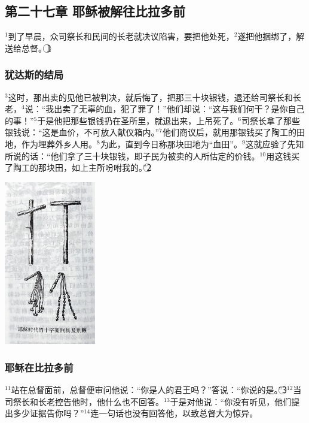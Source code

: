 \subsection{第二十七章 耶稣被解往比拉多前}
$^{1}$到了早晨，众司祭长和民间的长老就决议陷害\UL[耶稣]，要把他处死，$^{2}$遂把他捆绑了，解送给总督\UL[比拉多]。\textcircled{1}


\subsubsection{犹达斯的结局}
$^{3}$这时，那出卖\UL[耶稣]的\UL[犹达斯]见他已被判决，就后悔了，把那三十块银钱，退还给司祭长和长老，$^{4}$说：“我出卖了无辜的血，犯了罪了！”他们却说：“这与我们何干？是你自己的事！”$^{5}$于是他把那些银钱扔在圣所里，就退出来，上吊死了。$^{6}$司祭长拿了那些银钱说：“这是血价，不可放入献仪箱内。”$^{7}$他们商议后，就用那银钱买了陶工的田地，作为埋葬外乡人用。$^{8}$为此，直到今日称那块田地为“血田”。$^{9}$这就应验了\UL[耶肋米亚]先知所说的话：“他们拿了三十块银钱，即\UL[以色列]子民为被卖的人所估定的价钱。$^{10}$用这钱买了陶工的那块田，如上主所吩咐我的。”\textcircled{2}

\begin{center}
  \includegraphics[width=40mm]{images/耶稣时代的十字架刑具及刑鞭.png}
\end{center}


\subsubsection{耶稣在比拉多前}
$^{11}$\UL[耶稣]站在总督面前，总督便审问他说：“你是\UL[犹太]人的君王吗？”\UL[耶稣]答说：“你说的是。”\textcircled{3}$^{12}$当司祭长和长老控告他时，他什么也不回答。$^{13}$于是\UL[比拉多]对他说：“你没有听见，他们提出多少证据告你吗？”$^{14}$\UL[耶稣]连一句话也没有回答他，以致总督大为惊异。

